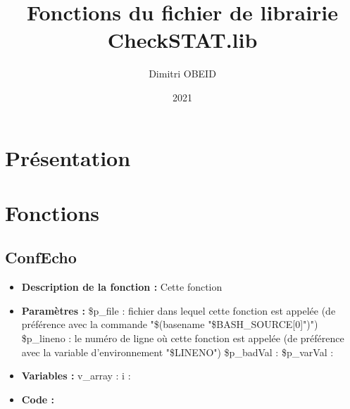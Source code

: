 \documentclass[a4paper,10pt]{article}
\title{Fonctions du fichier de librairie CheckSTAT.lib}
\author{Dimitri OBEID}
\date{2021}
\begin{document}
\maketitle
\newpage

\tableofcontents
\newpage

\section{Présentation}
\section{Fonctions}
\subsection{ConfEcho}
\begin{itemize}
    \item \textbf{Description de la fonction :} Cette fonction

    \item \textbf{Paramètres :} \$p\_file : fichier dans lequel cette fonction est appelée (de préférence avec la commande "\$(basename "\$BASH\_SOURCE[0]")")
    \$p\_lineno : le numéro de ligne où cette fonction est appelée (de préférence avec la variable d'environnement "\$LINENO")
    \$p\_badVal :
    \$p\_varVal :
    
    \item \textbf{Variables :} v\_array :
    i :

    \item \textbf{Code :}
\end{itemize}
\end{document}
